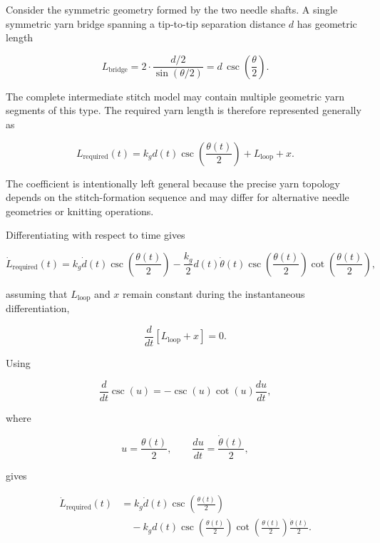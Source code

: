 \documentclass[12pt, a4paper]{article}
\begin{document}
Consider the symmetric geometry formed by the two needle shafts. A single symmetric yarn bridge spanning a tip-to-tip separation distance $d$ has geometric length

\begin{equation}
L_{\text{bridge}}
=
2\cdot
\frac{d/2}{\sin(\theta/2)}
=
d\,
\csc\left(\frac{\theta}{2}\right).
\end{equation}

The complete intermediate stitch model may contain multiple geometric yarn segments of this type. The required yarn length is therefore represented generally as

\begin{equation}
L_{\text{required}}(t)
=
k_g d(t)
\csc\left(\frac{\theta(t)}{2}\right)
+
L_{\text{loop}}
+
x.
\end{equation}

The coefficient is intentionally left general because the precise yarn topology depends on the stitch-formation sequence and may differ for alternative needle geometries or knitting operations.

Differentiating with respect to time gives

\begin{equation}
\dot{L}_{\text{required}}(t)
=
k_g\dot{d}(t)
\csc\left(\frac{\theta(t)}{2}\right)
-
\frac{k_g}{2}
d(t)\dot{\theta}(t)
\csc\left(\frac{\theta(t)}{2}\right)
\cot\left(\frac{\theta(t)}{2}\right),
\end{equation}

assuming that $L_{\text{loop}}$ and $x$ remain constant during the instantaneous differentiation,

\begin{equation}
\frac{d}{dt}
\left[
L_{\text{loop}}+x
\right]
=
0.
\end{equation}

Using

\begin{equation}
\frac{d}{dt}\csc(u)
=
-\csc(u)\cot(u)\frac{du}{dt},
\end{equation}

where

\begin{equation}
u=\frac{\theta(t)}{2},
\qquad
\frac{du}{dt}
=
\frac{\dot{\theta}(t)}{2},
\end{equation}

gives

\begin{equation}
\begin{aligned}
\dot{L}_{\text{required}}(t)
&=
k_g\dot{d}(t)
\csc\left(\frac{\theta(t)}{2}\right)\\
&\quad
-
k_g d(t)
\csc\left(\frac{\theta(t)}{2}\right)
\cot\left(\frac{\theta(t)}{2}\right)
\frac{\dot{\theta}(t)}{2}.
\end{aligned}
\end{equation}
\end{document}
